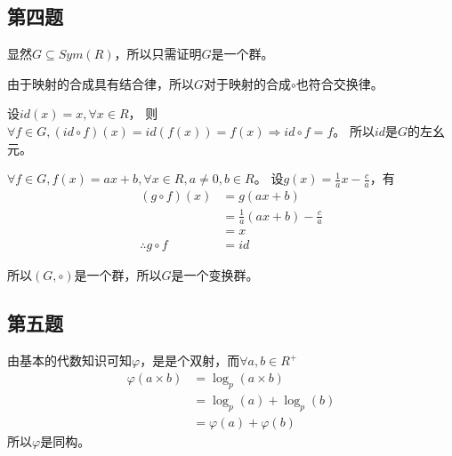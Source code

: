 \documentclass[12pt,onecolumn]{article}
\theoremstyle{plain}
\begin{document}
\subsection{第四题}
\begin{proof*}
  显然$G \subseteq Sym(R)$，所以只需证明$G$是一个群。

  由于映射的合成具有结合律，所以$G$对于映射的合成$\circ$也符合交换律。

  设$id(x) = x, \forall x \in R$，
  则$\forall f \in G, (id \circ f)(x) = id(f(x)) = f(x) \Rightarrow id \circ f = f$。
  所以$id$是$G$的左幺元。

  $\forall f \in G, f(x) = ax + b, \forall x \in R, a \neq 0, b \in R$。
  设$g(x) = \frac{1}{a}x - \frac{c}{a}$，有
  \begin{align*}
    (g \circ f)(x) &= g(ax + b) \\
               &= \frac{1}{a}(ax + b) - \frac{c}{a} \\
               &= x \\
    \therefore g \circ f &= id
  \end{align*}

  所以$(G, \circ)$是一个群，所以$G$是一个变换群。
\end{proof*}

\subsection{第五题}
\begin{proof*}
  由基本的代数知识可知$\varphi$，是是个双射，而$\forall a, b \in R^{+}$
  \begin{align*}
    \varphi(a \times b) &= \log_p(a \times b) \\
             &= \log_p(a) + \log_p(b) \\
             &= \varphi(a) + \varphi(b)
  \end{align*}
  所以$\varphi$是同构。
\end{proof*}
\end{document}
